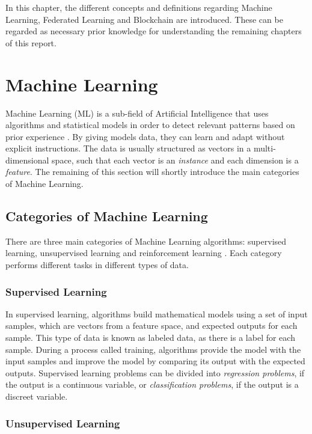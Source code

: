 In this chapter, the different concepts and definitions regarding Machine Learning, Federated Learning and Blockchain are introduced. These can be regarded as necessary prior knowledge for understanding the remaining chapters of this report.

\section{Machine Learning} \label{preliminaries:machine_learning}

Machine Learning (ML) is a sub-field of Artificial Intelligence that uses algorithms and statistical models in order to detect relevant patterns based on prior experience \cite{geron_2019}. By giving models data, they can learn and adapt without explicit instructions. The data is usually structured as vectors in a multi-dimensional space, such that each vector is an \textit{instance} and each dimension is a \textit{feature}. The remaining of this section will shortly introduce the main categories of Machine Learning.

\subsection{Categories of Machine Learning}

There are three main categories of Machine Learning algorithms: supervised learning, unsupervised learning and reinforcement learning \cite{geron_2019}. Each category performs different tasks in different types of data.

\subsubsection{Supervised Learning}

In supervised learning, algorithms build mathematical models using a set of input samples, which are vectors from a feature space, and expected outputs for each sample. This type of data is known as labeled data, as there is a label for each sample. During a process called training, algorithms provide the model with the input samples and improve the model by comparing its output with the expected outputs. Supervised learning problems can be divided into \textit{regression problems}, if the output is a continuous variable, or \textit{classification problems}, if the output is a discreet variable.

\subsubsection{Unsupervised Learning}


